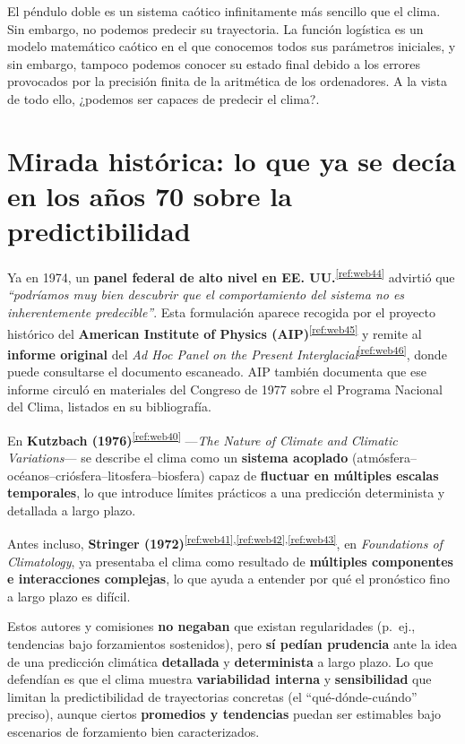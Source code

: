 \documentclass[
  10pt,
  a4paper,
  DIV=11,
  numbers=noendperiod,
  open=any]{scrreprt}
\numberwithin{equation}{chapter}
\numberwithin{equation}{section}
\renewcommand{\[}{\begin{equation}}
\renewcommand{\]}{\end{equation}}
\begin{document}
El péndulo doble es un sistema caótico infinitamente más sencillo que el
clima. Sin embargo, no podemos predecir su trayectoria. La función
logística es un modelo matemático caótico en el que conocemos todos sus
parámetros iniciales, y sin embargo, tampoco podemos conocer su estado
final debido a los errores provocados por la precisión finita de la
aritmética de los ordenadores. A la vista de todo ello, ¿podemos ser
capaces de predecir el clima?.

\section{Mirada histórica: lo que ya se decía en los años 70 sobre la
predictibilidad}\label{mirada-histuxf3rica-lo-que-ya-se-decuxeda-en-los-auxf1os-70-sobre-la-predictibilidad}

Ya en 1974, un \textbf{panel federal de alto nivel en EE. UU.}\textsuperscript{\ref{ref:web44}} advirtió que \emph{“podríamos muy bien descubrir que el comportamiento del sistema no es inherentemente predecible”}. Esta formulación aparece recogida por el proyecto histórico del \textbf{American Institute of Physics (AIP)}\textsuperscript{\ref{ref:web45}} y remite al \textbf{informe original} del \emph{Ad Hoc Panel on the Present Interglacial}\textsuperscript{\ref{ref:web46}}, donde puede consultarse el documento escaneado. AIP también documenta que ese informe circuló en materiales del Congreso de 1977 sobre el Programa Nacional del Clima, listados en su bibliografía.

En \textbf{Kutzbach (1976)}\textsuperscript{\ref{ref:web40}} —\emph{The Nature of Climate and Climatic Variations}— se describe el clima como un \textbf{sistema acoplado} (atmósfera–océanos–criósfera–litosfera–biosfera) capaz de \textbf{fluctuar en múltiples escalas temporales}, lo que introduce límites prácticos a una predicción determinista y detallada a largo plazo.  

Antes incluso, \textbf{Stringer (1972)}\textsuperscript{\ref{ref:web41},\ref{ref:web42},\ref{ref:web43}}, en \emph{Foundations of Climatology}, ya presentaba el clima como resultado de \textbf{múltiples componentes e interacciones complejas}, lo que ayuda a entender por qué el pronóstico fino a largo plazo es difícil.


Estos autores y comisiones \textbf{no negaban} que existan regularidades
(p.~ej., tendencias bajo forzamientos sostenidos), pero \textbf{sí
pedían prudencia} ante la idea de una predicción climática
\textbf{detallada} y \textbf{determinista} a largo plazo. Lo que
defendían es que el clima muestra \textbf{variabilidad interna} y
\textbf{sensibilidad} que limitan la predictibilidad de trayectorias
concretas (el ``qué-dónde-cuándo'' preciso), aunque ciertos
\textbf{promedios y tendencias} puedan ser estimables bajo escenarios de
forzamiento bien caracterizados.
\end{document}
